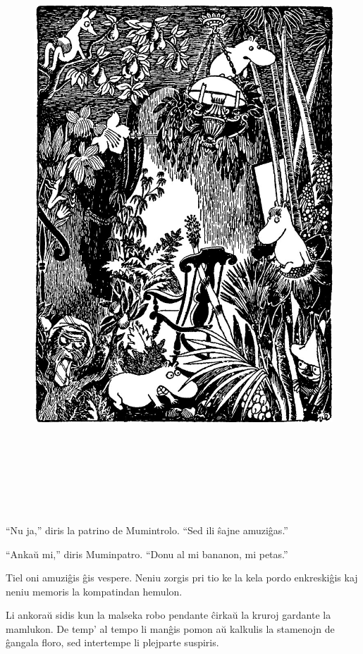 \begin{figure}[htbp]
\centering
\includegraphics[width=450pt,height=631pt]{_27.jpg}
\caption{}
\label{_27}
\end{figure}

``Nu ja,'' diris la patrino de Mumintrolo. ``Sed ili ŝajne amuziĝas.''

``Ankaŭ mi,'' diris Muminpatro. ``Donu al mi bananon, mi petas.''

Tiel oni amuziĝis ĝis vespere. Neniu zorgis pri tio ke la kela pordo enkreskiĝis kaj neniu memoris la kompatindan hemulon.

Li ankoraŭ sidis kun la malseka robo pendante ĉirkaŭ la kruroj gardante la mamlukon. De temp' al tempo li manĝis pomon aŭ kalkulis la stamenojn de ĝangala floro, sed intertempe li plejparte suspiris.

